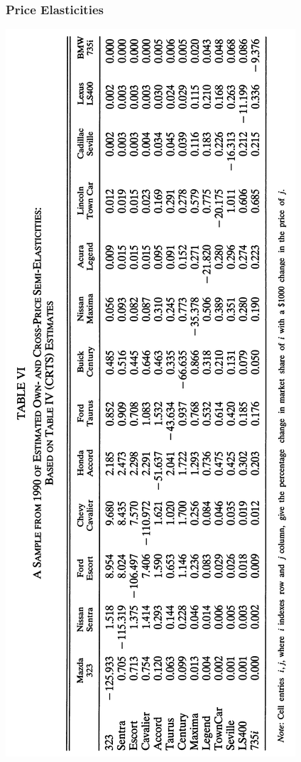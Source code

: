 \documentclass{beamer}
\begin{document}
\begin{frame}\frametitle{Price Elasticities}
    \centering
    \includegraphics[angle=270, width=\textwidth]{price_elasticities.png}
\end{frame}
\end{document}
